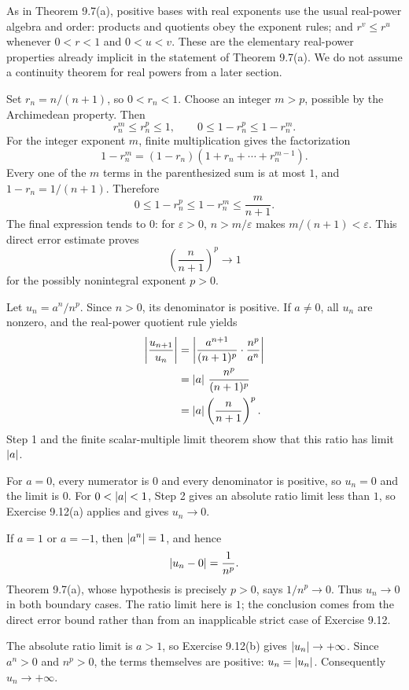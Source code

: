 As in Theorem 9.7(a), positive bases with real exponents use
the usual real-power algebra and order: products and quotients
obey the exponent rules; and $r^v\leq r^u$ whenever
$0<r<1$ and $0<u<v$. These are the elementary
real-power properties already implicit in the statement of
Theorem 9.7(a). We do not assume a continuity theorem for
real powers from a later section.

Set $r_n=n/(n+1)$, so $0<r_n<1$. Choose an integer $m>p$,
possible by the Archimedean property. Then
\[
 r_n^m\leq r_n^p\leq1,
 \qquad
 0\leq1-r_n^p\leq1-r_n^m.
\]
For the integer exponent $m$, finite multiplication gives the
factorization
\[
 1-r_n^m=(1-r_n)(1+r_n+\cdots+r_n^{m-1}).
\]
Every one of the $m$ terms in the parenthesized sum is at
most $1$, and $1-r_n=1/(n+1)$. Therefore
\[
 0\leq1-r_n^p\leq1-r_n^m
 \leq\frac{m}{n+1}.
\]
The final expression tends to $0$: for $\varepsilon>0$,
$n>m/\varepsilon$ makes $m/(n+1)<\varepsilon$.
This direct error estimate proves
\[
 \left(\frac n{n+1}\right)^p\longrightarrow1
\]
for the possibly nonintegral exponent $p>0$.

Let $u_n=a^n/n^p$. Since $n>0$, its denominator is positive.
If $a\ne0$, all $u_n$ are nonzero, and the real-power
quotient rule yields
\begin{align*}
 \left|\frac{u_{n+1}}{u_n}\right|
 &=\left|\frac{a^{n+1}}{(n+1)^p}\cdot\frac{n^p}{a^n}\right|\\
 &=\left|a\right|\,\frac{n^p}{(n+1)^p}\\
 &=\left|a\right|\left(\frac n{n+1}\right)^p.
\end{align*}
Step 1 and the finite scalar-multiple limit theorem show that
this ratio has limit $\left|a\right|$.

For $a=0$, every numerator is $0$ and every denominator is
positive, so $u_n=0$ and the limit is $0$.
For $0<\left|a\right|<1$, Step 2 gives an absolute ratio limit
less than $1$, so Exercise 9.12(a) applies and gives $u_n\to0$.

If $a=1$ or $a=-1$, then $\left|a^n\right|=1$, and hence
\[
 \left|u_n-0\right|=\frac1{n^p}.
\]
Theorem 9.7(a), whose hypothesis is precisely $p>0$, says
$1/n^p\to0$. Thus $u_n\to0$ in both boundary cases.
The ratio limit here is $1$; the conclusion comes from the
direct error bound rather than from an inapplicable strict
case of Exercise 9.12.

The absolute ratio limit is $a>1$, so Exercise 9.12(b) gives
$\left|u_n\right|\to+\infty$. Since $a^n>0$ and $n^p>0$,
the terms themselves are positive: $u_n=\left|u_n\right|$.
Consequently $u_n\to+\infty$.

